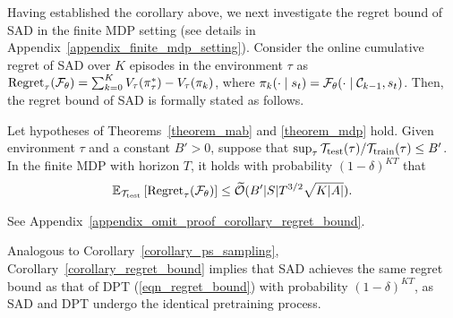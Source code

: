 Having established the corollary above, we next investigate the regret bound of SAD in the finite MDP setting (see details in Appendix~\ref{appendix_finite_mdp_setting}).
%
Consider the online cumulative regret of SAD over $K$ episodes in the environment $\tau$ as $\text{Regret}_\tau({\mathcal F}_{\theta}) = \sum_{k=0}^K V_\tau (\pi_\tau^*) - V_\tau(\pi_k)$, where $\pi_k (\cdot \mid s_t) = {\mathcal F}_{\theta}(\cdot \mid {\ensuremath{\mathcal C}}_{k-1}, s_t)$.
%
Then, the regret bound of SAD is formally stated as follows.
%
\begin{corollary}
\label{corollary_regret_bound}
Let hypotheses of Theorems~\ref{theorem_mab} and \ref{theorem_mdp} hold.
%
Given environment $\tau$ and a constant $B' > 0$, suppose that $\sup_{\tau} {{\mathcal T}_{\text{test}}(\tau)}/{{\mathcal T}_{\text{train}}(\tau)} \leq B'$. In the finite MDP with horizon $T$, it holds with probability $(1-\delta)^{KT}$ that
\begin{align}
       {\ensuremath{\mathbb E}}_{{\mathcal T}_{\text{test}}} \left[ \text{Regret}_\tau({\mathcal F}_{\theta}) \right]  \leq \widetilde{{\mathcal O}} (B' |S| T^{3/2} \sqrt{K |A|}). \label{eqn_regret_bound}
\end{align}
%
\end{corollary}
%
\begin{myproof}
    See Appendix~\ref{appendix_omit_proof_corollary_regret_bound}.
\end{myproof}
%
Analogous to Corollary~\ref{corollary_ps_sampling}, Corollary~\ref{corollary_regret_bound} implies that SAD achieves the same regret bound as that of DPT (\eqref{eqn_regret_bound}) with probability $(1-\delta)^{KT}$, as SAD and DPT undergo the identical pretraining process.













